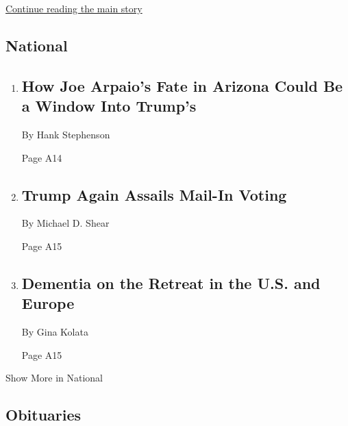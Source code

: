 \protect\hyperlink{after-mid2}{Continue reading the main story}

\hypertarget{national}{%
\subsection{National}\label{national}}

\begin{enumerate}
\def\labelenumi{\arabic{enumi}.}
\item
  \href{/2020/08/02/us/politics/arizona-election-joe-arpaio.html}{}

  \hypertarget{how-joe-arpaios-fate-in-arizona-could-be-a-window-into-trumps-1}{%
  \subsection{How Joe Arpaio's Fate in Arizona Could Be a Window Into
  Trump's}\label{how-joe-arpaios-fate-in-arizona-could-be-a-window-into-trumps-1}}

  By Hank Stephenson

  Page A14
\item
  \href{/2020/08/03/us/politics/trump-mail-in-voting.html}{}

  \hypertarget{trump-again-assails-mail-in-voting}{%
  \subsection{Trump Again Assails Mail-In
  Voting}\label{trump-again-assails-mail-in-voting}}

  By Michael D. Shear

  Page A15
\item
  \href{/2020/08/03/health/alzheimers-dementia-rates.html}{}

  \hypertarget{dementia-on-the-retreat-in-the-us-and-europe}{%
  \subsection{Dementia on the Retreat in the U.S. and
  Europe}\label{dementia-on-the-retreat-in-the-us-and-europe}}

  By Gina Kolata

  Page A15
\end{enumerate}

Show More in National

\hypertarget{obituaries}{%
\subsection{Obituaries}\label{obituaries}}

